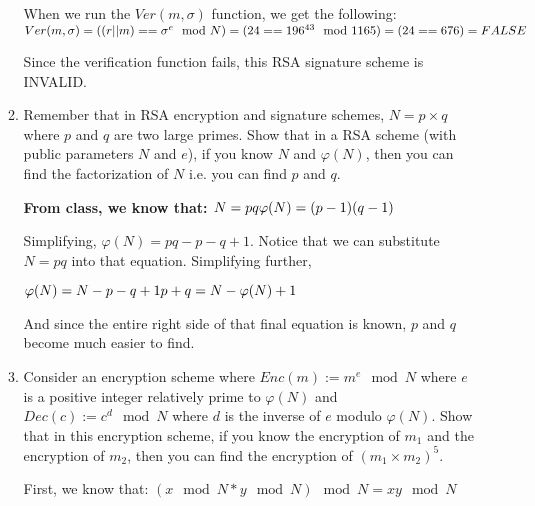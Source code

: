 \documentclass[11pt]{article}
\begin{document}
\begin{enumerate}
\begin{enumerate}
{      When we run the $Ver(m, \sigma)$ function, we get the following: \newline
      $Ver(m, \sigma) = ( (r||m) == \sigma^e \mod N) \newline
      = (24 == 196^{43} \mod 1165) \newline
      = (24 == 676) \newline
      = FALSE$ \newline

      Since the verification function fails, this RSA signature scheme is INVALID. \newline
    }
 
    \newpage
    \item 
    Remember that in RSA encryption and signature schemes, $N=p\times q$ where $p$ and $q$ are two large primes. Show that in a RSA scheme (with public parameters $N$ and $e$), if you know $N$ and $\varphi(N)$, then you can find the factorization of $N$ i.e. you can find $p$ and $q$.
    \newline
   {\bfseries
    From class, we know that: \newline
    $N = pq \newline
    \varphi(N) = (p-1)(q-1) \newline
    $

    Simplifying, $\varphi(N) = pq-p-q+1$. Notice that we can substitute $N=pq$ into that equation. Simplifying further, \newline

    $\varphi(N) = N-p-q+1 \newline
    p+q = N - \varphi(N) + 1 \newline$

    And since the entire right side of that final equation is known, $p$ and $q$ become much easier to find. \newline
   }

    \vspace {0.1\textheight}
    \item Consider an encryption scheme where 
    $Enc(m):=m^e \mod{N}$ where $e$ is a positive integer relatively prime to $\varphi(N)$ and $Dec(c):=c^d \mod{N}$ where $d$ is the inverse of $e$ modulo $\varphi(N)$.
    Show that in this encryption scheme, if you know the encryption of $m_1$ and the encryption of $m_2$, then you can find 
    the encryption of $(m_1\times m_2)^5$.
    \newline 
   {\bfseries

    First, we know that: \newline
    $(x\mod N * y\mod N)\mod N = xy\mod N$ \newline

}
\end{enumerate}
\end{enumerate}
\end{document}
